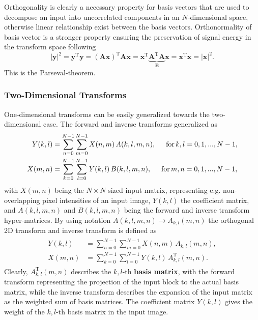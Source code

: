 Orthogonality is clearly a necessary property for basis vectors that are used to decompose an input into uncorrelated components in an $N$-dimensional space, otherwise linear relationship exist between the basis vectors.
Orthonormality of basis vector is a stronger property ensuring the preservation of signal energy in the transform space following
\begin{equation}
\left| \mathbf{y} \right|^2 = \mathbf{y}^{\mathrm{T}} \mathbf{y} = \left(\mathbf{A}\mathbf{x}\right)^{\mathrm{T}} \mathbf{\mathbf{A} \mathbf{x}} = \mathbf{x}^{\mathrm{T}} \underbrace{ \mathbf{A}^{\mathrm{T}}\mathbf{A} }_{\mathbf{E}} \mathbf{x} = \mathbf{x}^{\mathrm{T}} \mathbf{x}  =| \mathbf{x} |^2.
\label{Eq:Parseval}
\end{equation}
This is the Parseval-theorem.

\subsubsection{Two-Dimensional Transforms}
One-dimensional transforms can be easily generalized towards the two-dimensional case.
The forward and inverse transforms generalized as
\begin{align}
\begin{split}
Y(k,l) &= \sum_{n=0}^{N-1} \sum_{m=0}^{N-1} X(n,m) \, A(k,l,m,n), \hspace{5mm} \text{for} \, k,l = 0,1,...,N-1,
\\
X(m,n) &= \sum_{k=0}^{N-1} \sum_{l=0}^{N-1} Y(k,l) \, B(k,l,m,n), \hspace{5mm} \text{for} \, m,n = 0,1,...,N-1,
\end{split}
\label{Eq:2D_Tr}
\end{align}
with $X(m,n)$ being the $N\times N$ sized input matrix, representing e.g. non-overlapping pixel intensities of an input image, $Y(k,l)$ the coefficient matrix, and $A(k,l,m,n)$ and $B(k,l,m,n)$ being the forward and inverse transform hyper-matrices.
By using notation $A(k,l,m,n) \rightarrow A_{k,l}(m,n)$ the orthogonal 2D transform and inverse transform is defined as
\begin{align}
\begin{split}
Y(k,l) &= \sum_{n=0}^{N-1} \sum_{m=0}^{N-1} X(n,m) \, A_{k,l}(m,n), 
\\
X(m,n) &= \sum_{k=0}^{N-1} \sum_{l=0}^{N-1} Y(k,l) \, A^{\mathrm{T}}_{k,l}(m,n).
\end{split}
\end{align}
Clearly, $A_{k,l}^{\mathrm{T}}(m,n)$ describes the $k,l$-th \textbf{basis matrix}, with the forward transform representing the projection of the input block to the actual basis matrix, while the inverse transform describes the expansion of the input matrix as the weighted sum of basis matrices.
The coefficient matrix $Y(k,l)$ gives the weight of the $k,l$-th basis matrix in the input image.

